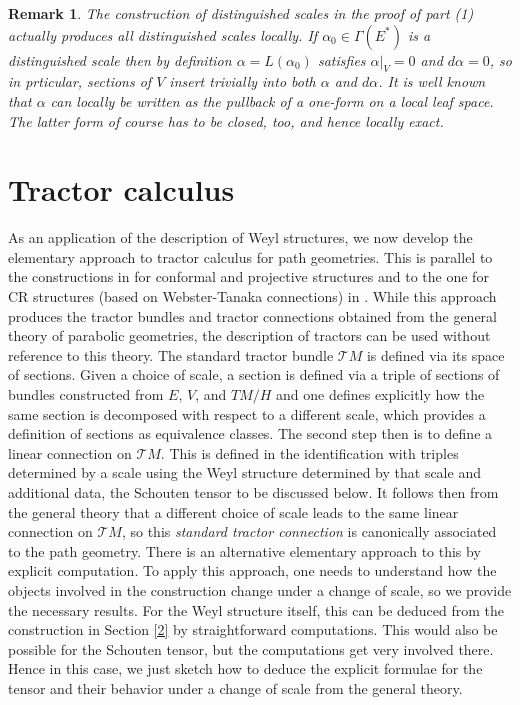 \documentclass[11pt]{amsart}
\newtheorem{remark}[proposition]{Remark}
\numberwithin{proposition}{section}
\numberwithin{equation}{section}
\begin{document}
\begin{remark}\label{rem:dist}
    The construction of distinguished scales in the proof of part (1) actually produces all distinguished scales locally. If $\alpha_0\in\Gamma(E^*)$ is a distinguished scale then by definition $\alpha=L(\alpha_0)$ satisfies $\alpha|_V=0$ and $d\alpha=0$, so in prticular, sections of $V$ insert trivially into both $\alpha$ and $d\alpha$. It is well known that $\alpha$ can locally be written as the pullback of a one-form on a local leaf space. The latter form of course has to be closed, too, and hence locally exact. 
\end{remark}

\section{Tractor calculus}\label{4}
As an application of the description of Weyl structures, we now develop the elementary approach to tractor calculus for path geometries. This is parallel to the constructions in \cite{BEG} for conformal and projective structures and to the one for CR structures (based on Webster-Tanaka connections) in \cite{Go-Gr}. While this approach produces the tractor bundles and tractor connections obtained from the general theory of parabolic geometries, the description of tractors can be used without reference to this theory. The standard tractor bundle $\mathcal T M$ is defined via its space of sections. Given a choice of scale, a section is defined via a triple of sections of bundles constructed from $E$, $V$, and $TM/H$ and one defines explicitly how the same section is decomposed with respect to a different scale, which provides a definition of sections as equivalence classes. The second step then is to define a linear connection on $\mathcal TM$. This is defined in the identification with triples determined by a scale using the Weyl structure determined by that scale and additional data, the Schouten tensor to be discussed below. It follows then from the general theory that a different choice of scale leads to the same linear connection on $\mathcal{T}M$, so this \textit{standard tractor connection} is canonically associated to the path geometry. There is an alternative elementary approach to this by explicit computation. To apply this approach, one needs to understand how the objects involved in the construction change under a change of scale, so we provide the necessary results. For the Weyl structure itself, this can be deduced from the construction in Section \ref{2} by straightforward computations. This would also be possible for the Schouten tensor, but the computations get very involved there. Hence in this case, we just sketch how to deduce the explicit formulae for the tensor and their behavior under a change of scale from the general theory. 
\end{document}
